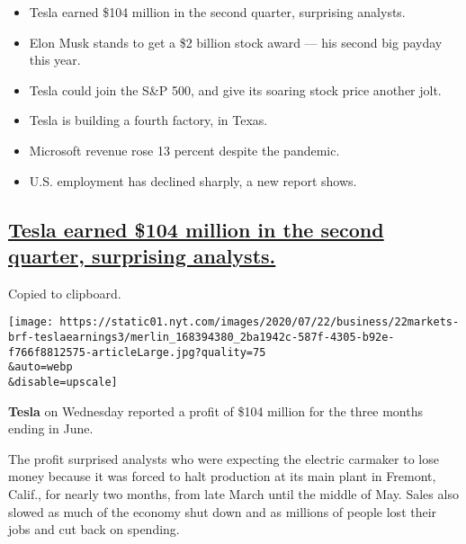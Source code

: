 \begin{itemize}
\item
  \protect\hyperlink{tesla-earnings}{}

  Tesla earned \$104 million in the second quarter, surprising analysts.
\item
  \protect\hyperlink{elon-musk-salary}{}

  Elon Musk stands to get a \$2 billion stock award --- his second big
  payday this year.
\item
  \protect\hyperlink{tesla-s-and-p-500}{}

  Tesla could join the S\&P 500, and give its soaring stock price
  another jolt.
\item
  \protect\hyperlink{tesla-is-building-a-fourth-factory-in-texas}{}

  Tesla is building a fourth factory, in Texas.
\item
  \protect\hyperlink{microsoft-earnings}{}

  Microsoft revenue rose 13 percent despite the pandemic.
\item
  \protect\hyperlink{us-employment-has-declined-sharply-a-new-report-shows}{}

  U.S. employment has declined sharply, a new report shows.
\end{itemize}

\hypertarget{tesla-earned-104-million-in-the-second-quarter-surprising-analysts}{%
\subsection{\texorpdfstring{\protect\hyperlink{tesla-earnings}{Tesla
earned \$104 million in the second quarter, surprising
analysts.}}{Tesla earned \$104 million in the second quarter, surprising analysts.}}\label{tesla-earned-104-million-in-the-second-quarter-surprising-analysts}}

Copied to clipboard.

\texttt{[image: https://static01.nyt.com/images/2020/07/22/business/22markets-brf-teslaearnings3/merlin\_168394380\_2ba1942c-587f-4305-b92e-f766f8812575-articleLarge.jpg?quality=75\\\&auto=webp\\\&disable=upscale]}

\textbf{Tesla} on Wednesday reported a profit of \$104 million for the
three months ending in June.

The profit surprised analysts who were expecting the electric carmaker
to lose money because it was forced to halt production at its main plant
in Fremont, Calif., for nearly two months, from late March until the
middle of May. Sales also slowed as much of the economy shut down and as
millions of people lost their jobs and cut back on spending.

